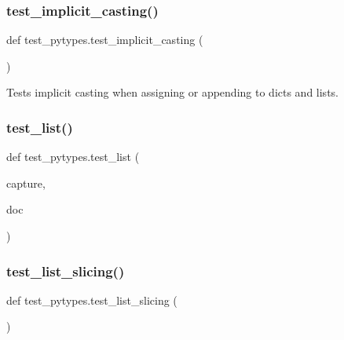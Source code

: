 \subsubsection{\texorpdfstring{test\_implicit\_casting()}{test\_implicit\_casting()}}
{\footnotesize\ttfamily def test\+\_\+pytypes.\+test\+\_\+implicit\+\_\+casting (\begin{DoxyParamCaption}{ }\end{DoxyParamCaption})}

\begin{DoxyVerb}Tests implicit casting when assigning or appending to dicts and lists.\end{DoxyVerb}
 \mbox{\label{namespacetest__pytypes_a864bb5562ada50f255b896f1136134ab}} 
\subsubsection{\texorpdfstring{test\_list()}{test\_list()}}
{\footnotesize\ttfamily def test\+\_\+pytypes.\+test\+\_\+list (\begin{DoxyParamCaption}\item[{}]{capture,  }\item[{}]{doc }\end{DoxyParamCaption})}

\mbox{\label{namespacetest__pytypes_a9fa1200e2b889b4db79ab546967641ab}} 
\subsubsection{\texorpdfstring{test\_list\_slicing()}{test\_list\_slicing()}}
{\footnotesize\ttfamily def test\+\_\+pytypes.\+test\+\_\+list\+\_\+slicing (\begin{DoxyParamCaption}{ }\end{DoxyParamCaption})}

\mbox{\label{namespacetest__pytypes_a37198618529e1a4245bc93947e2e6a54}} 
